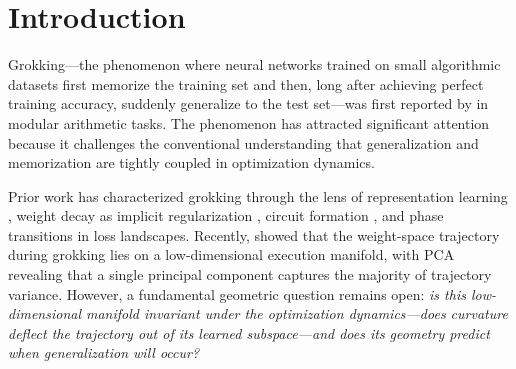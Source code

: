 \documentclass[11pt]{article}
\begin{document}
\begin{abstract}
All findings replicate across this learning-rate range, a qualitatively different slow regime ($\mathrm{lr}=5\!\times\!10^{-5}$, $\mathrm{wd}=0.1$, 3 layers), and three random seeds, though alignment dynamics differ quantitatively between regimes.
Causal intervention experiments establish that orthogonal gradient flow is necessary but not sufficient for grokking: suppressing it prevents generalization with a monotonic dose--response across four operations, while artificially boosting curvature defects has no effect.
Weight-SVD spectral analysis reveals the mechanism: grokking is preceded by a near-degeneracy of the leading singular values of the attention matrices ($\sigma_1 \approx \sigma_2$), creating an orientation instability that drives the commutator transition.
Generalization coincides with the breaking of this spectral symmetry as one mode dominates.
This spectral structure is confirmed to be basis-independent: three independent decompositions (weight SVD, displacement SVD, gradient SVD) all exhibit a consistent sign flip in the commutator--subspace alignment at grokking.

\end{abstract}

\section{Introduction}
\label{sec:intro}

Grokking---the phenomenon where neural networks trained on small algorithmic datasets first memorize the training set and then, long after achieving perfect training accuracy, suddenly generalize to the test set---was first reported by \citet{power2022grokking} in modular arithmetic tasks.
The phenomenon has attracted significant attention because it challenges the conventional understanding that generalization and memorization are tightly coupled in optimization dynamics.

Prior work has characterized grokking through the lens of representation learning \citep{nanda2023grokking}, weight decay as implicit regularization \citep{liu2022omnigrok}, circuit formation \citep{zhong2024clock}, and phase transitions in loss landscapes.
Recently, \citet{xu2026lowdim} showed that the weight-space trajectory during grokking lies on a low-dimensional execution manifold, with PCA revealing that a single principal component captures the majority of trajectory variance.
However, a fundamental geometric question remains open: \emph{is this low-dimensional manifold invariant under the optimization dynamics---does curvature deflect the trajectory out of its learned subspace---and does its geometry predict when generalization will occur?}
\end{document}

